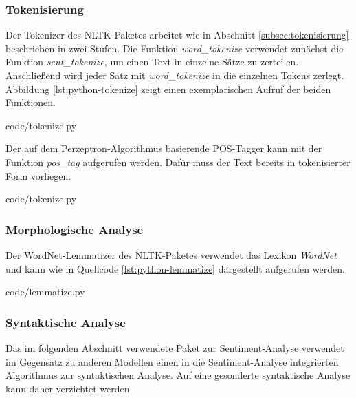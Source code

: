\documentclass[
	a4paper,
	12pt,
	bibliography=totocnumbered,
	twoside,
]{scrreprt}
\begin{document}
\subsubsection*{Tokenisierung}
Der Tokenizer des NLTK-Paketes arbeitet wie in Abschnitt \ref{subsec:tokenisierung} beschrieben in zwei Stufen. Die Funktion \textit{word\_tokenize} verwendet zunächst die Funktion \textit{sent\_tokenize}, um einen Text in einzelne Sätze zu zerteilen. Anschließend wird jeder Satz mit \textit{word\_tokenize} in die einzelnen Tokens zerlegt. Abbildung \ref{lst:python-tokenize} zeigt einen exemplarischen Aufruf der beiden Funktionen.


                 {code/tokenize.py}


Der auf dem Perzeptron-Algorithmus basierende POS-Tagger kann mit der Funktion \textit{pos\_tag} aufgerufen werden. Dafür muss der Text bereits in tokenisierter Form vorliegen.


                 {code/tokenize.py}

\clearpage
\subsubsection*{Morphologische Analyse}
Der WordNet-Lemmatizer des NLTK-Paketes verwendet das Lexikon \textit{WordNet} und kann wie in Quellcode \ref{lst:python-lemmatize} dargestellt aufgerufen werden.


                 {code/lemmatize.py}


\subsubsection*{Syntaktische Analyse}
Das im folgenden Abschnitt verwendete Paket zur Sentiment-Analyse verwendet im Gegensatz zu anderen Modellen einen in die Sentiment-Analyse integrierten Algorithmus zur syntaktischen Analyse. Auf eine gesonderte syntaktische Analyse kann daher verzichtet werden.\\
\end{document}
